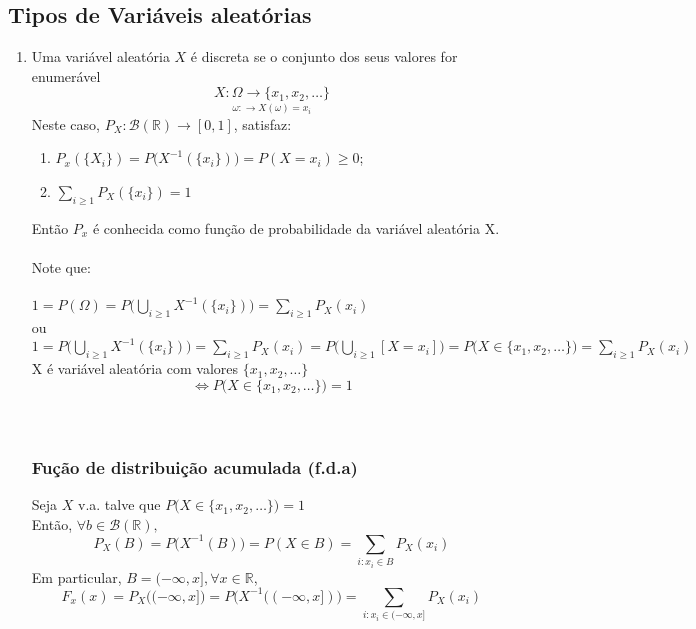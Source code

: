 \documentclass[a4paper,12pt]{article}
\begin{document}
\newpage
\subsection{Tipos de Variáveis aleatórias}

\begin{enumerate}
	\item Uma  variável aleatória  $X$ é discreta se o conjunto dos seus valores for enumerável
	$$\underset{\omega: \longrightarrow X(\omega)=x_i}{X:\Omega \longrightarrow\{x_1,x_2,\ldots\}} $$
	Neste caso, $P_X: \mathscr{B}(\mathbb{R}) \rightarrow [0,1]$, satisfaz:
	\begin{enumerate}[label=\roman*)]
		\item $P_x(\{X_i\})= P\bigg(X^{-1}(\{x_i\}) \bigg)=P(X=x_i)\ge 0$;
		\item $\sum\limits_{i\ge 1}P_X(\{x_i\})=1$
	\end{enumerate}
Então $P_x$ é conhecida como função de probabilidade da variável aleatória X.\\
\\
Note que:\\
\\
$1=P(\Omega)=P\bigg( \bigcup\limits_{i\ge 1} X^{-1}(\{x_i\})\bigg)=\sum\limits_{i\ge 1}P_X(x_i)$\\
ou\\
$1=P\bigg( \bigcup\limits_{i\ge 1} X^{-1}(\{x_i\})\bigg)=\sum\limits_{i\ge 1}P_X(x_i) = P\bigg(\bigcup\limits_{i\ge 1} [X=x_i]\bigg)
=P\bigg( X\in \{x_1,x_2,\ldots\}\bigg)=\sum\limits_{i\ge 1} P_X(x_i)
$\\
	 X é variável aleatória com valores $\{x_1,x_2,\ldots\}$
	 $$\Leftrightarrow P\bigg( X\in \{x_1,x_2,\ldots\} \bigg) =1$$
	 \\
	 \\
	 \subsubsection{Fução de distribuição acumulada (f.d.a)}
	 Seja $X$ v.a. talve que $P\bigg( X\in \{x_1,x_2,\ldots\} \bigg) =1$\\
	 Então, $\forall b \in \mathscr{B}(\mathbb{R}),$
	 $$P_X(B)=P\bigg( X^{-1}(B) \bigg) = P(X\in B)= \sum\limits_{i:x_i\in B} P_X(x_i) $$
	 Em particular, $B=(-\infty,x], \forall x\in \mathbb{R}$,
	 $$F_x(x)= P_X\bigg( (-\infty,x]\bigg)=P\bigg( X^{-1}((-\infty,x])\bigg) =  \sum\limits_{i:x_i\in (-\infty,x]} P_X(x_i)   $$
\end{enumerate}
\end{document}
